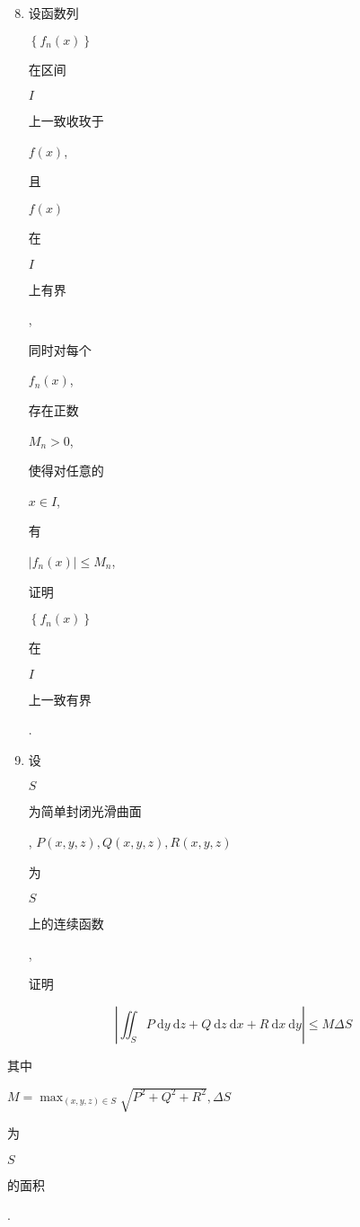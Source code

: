 \documentclass[10pt]{article}
\begin{document}
\begin{enumerate}
  \setcounter{enumi}{7}
  \item \begin{CJK}{UTF8}{mj}设函数列\end{CJK} $\left\{f_{n}(x)\right\}$ \begin{CJK}{UTF8}{mj}在区间\end{CJK} $I$ \begin{CJK}{UTF8}{mj}上一致收玫于\end{CJK} $f(x)$, \begin{CJK}{UTF8}{mj}且\end{CJK} $f(x)$ \begin{CJK}{UTF8}{mj}在\end{CJK} $I$ \begin{CJK}{UTF8}{mj}上有界\end{CJK}, \begin{CJK}{UTF8}{mj}同时对每个\end{CJK} $f_{n}(x)$, \begin{CJK}{UTF8}{mj}存在正数\end{CJK} $M_{n}>0$, \begin{CJK}{UTF8}{mj}使得对任意的\end{CJK} $x \in I$, \begin{CJK}{UTF8}{mj}有\end{CJK} $\left|f_{n}(x)\right| \leq M_{n}$, \begin{CJK}{UTF8}{mj}证明\end{CJK} $\left\{f_{n}(x)\right\}$ \begin{CJK}{UTF8}{mj}在\end{CJK} $I$ \begin{CJK}{UTF8}{mj}上一致有界\end{CJK}.

  \item \begin{CJK}{UTF8}{mj}设\end{CJK} $S$ \begin{CJK}{UTF8}{mj}为简单封闭光滑曲面\end{CJK}, $P(x, y, z), Q(x, y, z), R(x, y, z)$ \begin{CJK}{UTF8}{mj}为\end{CJK} $S$ \begin{CJK}{UTF8}{mj}上的连续函数\end{CJK}, \begin{CJK}{UTF8}{mj}证明\end{CJK}

\end{enumerate}
$$
\left|\iint_{S} P \mathrm{~d} y \mathrm{~d} z+Q \mathrm{~d} z \mathrm{~d} x+R \mathrm{~d} x \mathrm{~d} y\right| \leq M \Delta S
$$
\begin{CJK}{UTF8}{mj}其中\end{CJK} $M=\max _{(x, y, z) \in S} \sqrt{P^{2}+Q^{2}+R^{2}}, \Delta S$ \begin{CJK}{UTF8}{mj}为\end{CJK} $S$ \begin{CJK}{UTF8}{mj}的面积\end{CJK}.
\end{document}
